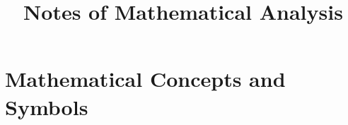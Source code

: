 \documentclass[11pt,oneside]{book}
\title{Notes of Mathematical Analysis}
\author{}
\date{}
\begin{document}
\chapter{Mathematical Concepts and Symbols}


\end{document}
